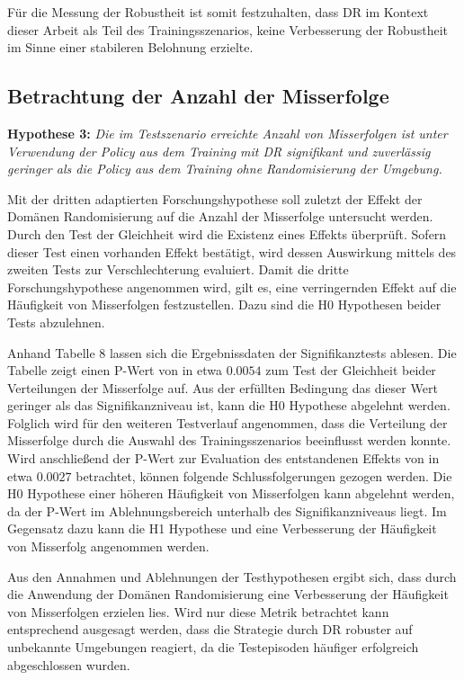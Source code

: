 Für die Messung der Robustheit ist somit festzuhalten, dass DR im Kontext dieser Arbeit als Teil des Trainingsszenarios, keine Verbesserung der Robustheit im Sinne einer stabileren Belohnung erzielte.

\subsection{Betrachtung der Anzahl der Misserfolge}

\textbf{Hypothese 3:}
\textit{Die im Testszenario erreichte Anzahl von Misserfolgen ist unter Verwendung der Policy aus dem Training mit DR signifikant und zuverlässig geringer als die Policy aus dem Training ohne Randomisierung der Umgebung.}

Mit der dritten adaptierten Forschungshypothese soll zuletzt der Effekt der Domänen Randomisierung auf die Anzahl der Misserfolge untersucht werden.
Durch den Test der Gleichheit wird die Existenz eines Effekts überprüft.
Sofern dieser Test einen vorhanden Effekt bestätigt, wird dessen Auswirkung mittels des zweiten Tests zur Verschlechterung evaluiert.
Damit die dritte Forschungshypothese angenommen wird, gilt es, eine verringernden Effekt auf die Häufigkeit von Misserfolgen festzustellen.
Dazu sind die H0 Hypothesen beider Tests abzulehnen.

Anhand Tabelle 8 lassen sich die Ergebnissdaten der Signifikanztests ablesen.
Die Tabelle zeigt einen P-Wert von in etwa $0.0054$ zum Test der Gleichheit beider Verteilungen der Misserfolge auf.
Aus der erfüllten Bedingung das dieser Wert geringer als das Signifikanzniveau ist, kann die H0 Hypothese abgelehnt werden.
Folglich wird für den weiteren Testverlauf angenommen, dass die Verteilung der Misserfolge durch die Auswahl des Trainingsszenarios beeinflusst werden konnte.
Wird anschließend der P-Wert zur Evaluation des entstandenen Effekts von in etwa $0.0027$ betrachtet, können folgende Schlussfolgerungen gezogen werden.
Die H0 Hypothese einer höheren Häufigkeit von Misserfolgen kann abgelehnt werden, da der P-Wert im Ablehnungsbereich unterhalb des Signifikanzniveaus liegt.
Im Gegensatz dazu kann die H1 Hypothese und eine Verbesserung der Häufigkeit von Misserfolg angenommen werden.

Aus den Annahmen und Ablehnungen der Testhypothesen ergibt sich, dass durch die Anwendung der Domänen Randomisierung eine Verbesserung der Häufigkeit von Misserfolgen erzielen lies.
Wird nur diese Metrik betrachtet kann entsprechend ausgesagt werden, dass die Strategie durch DR robuster auf unbekannte Umgebungen reagiert, da die Testepisoden häufiger erfolgreich abgeschlossen wurden.